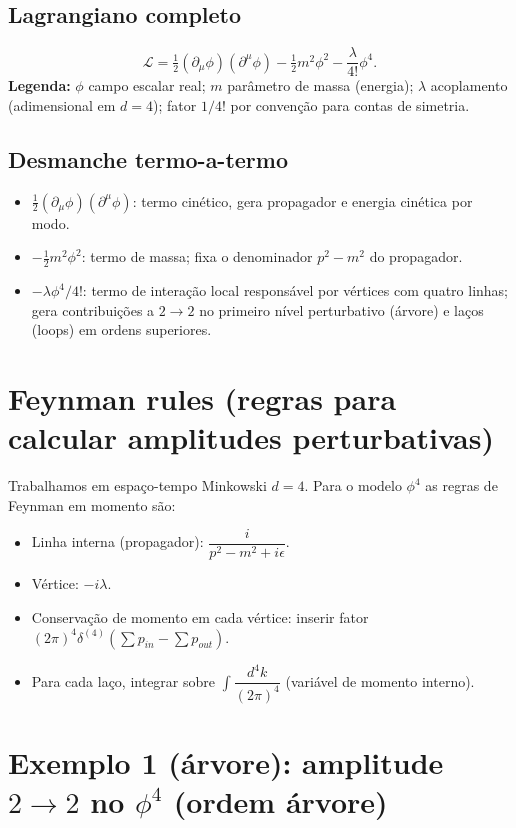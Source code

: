 \documentclass[12pt,a4paper]{article}
\begin{document}
\subsection{Lagrangiano completo}
\begin{equation}\label{lag_phi4}
\mathcal{L} = \tfrac12(\partial_\mu\phi)(\partial^\mu\phi) - \tfrac12 m^2 \phi^2 - \frac{\lambda}{4!}\phi^4.
\end{equation}
\textbf{Legenda:} \(\phi\) campo escalar real; \(m\) parâmetro de massa (energia); \(\lambda\) acoplamento (adimensional em \(d=4\)); fator \(1/4!\) por convenção para contas de simetria.

\subsection{Desmanche termo-a-termo}
\begin{itemize}
\item \(\tfrac12(\partial_\mu\phi)(\partial^\mu\phi)\): termo cinético, gera propagador e energia cinética por modo.
\item \(-\tfrac12 m^2\phi^2\): termo de massa; fixa o denominador \(p^2 - m^2\) do propagador.
\item \(-\lambda\phi^4/4!\): termo de interação local responsável por vértices com quatro linhas; gera contribuições a \(2\to2\) no primeiro nível perturbativo (árvore) e laços (loops) em ordens superiores.
\end{itemize}

\section{Feynman rules (regras para calcular amplitudes perturbativas)}
Trabalhamos em espaço-tempo Minkowski \(d=4\). Para o modelo \(\phi^4\) as regras de Feynman em momento são:
\begin{itemize}
\item Linha interna (propagador): \(\dfrac{i}{p^2 - m^2 + i\epsilon}\).
\item Vértice: \(-i\lambda\).
\item Conservação de momento em cada vértice: inserir fator \((2\pi)^4\delta^{(4)}(\sum p_{in}-\sum p_{out})\).
\item Para cada laço, integrar sobre \(\int\dfrac{d^4k}{(2\pi)^4}\) (variável de momento interno).
\end{itemize}

\section{Exemplo 1 (árvore): amplitude \(2\to2\) no \(\phi^4\) (ordem árvore)}
\end{document}
